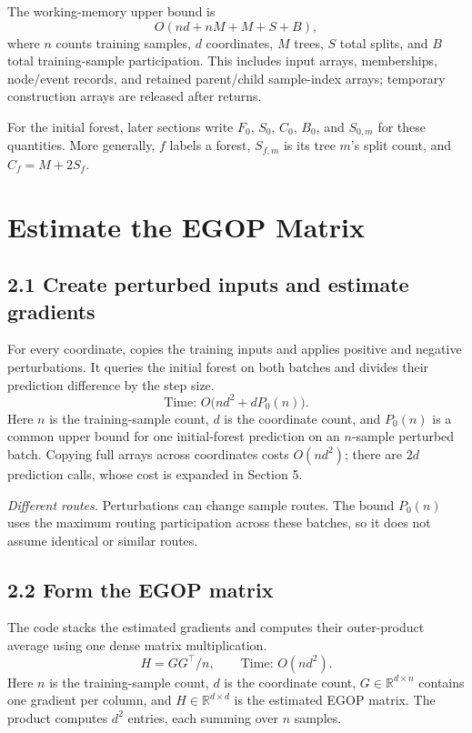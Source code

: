 \documentclass[11pt]{article}
\newcommand{\code}[1]{\texttt{\detokenize{#1}}}
\begin{document}
The working-memory upper bound is
\[
O(nd+nM+M+S+B),
\]
where $n$ counts training samples, $d$ coordinates, $M$ trees, $S$ total splits,
and $B$ total training-sample participation. This includes input arrays,
memberships, node/event records, and retained parent/child sample-index arrays;
temporary construction arrays are released after \code{train} returns.

For the initial forest, later sections write $F_0$, $S_0$, $C_0$, $B_0$, and
$S_{0,m}$ for these quantities. More generally, $f$ labels a forest,
$S_{f,m}$ is its tree $m$'s split count, and $C_f=M+2S_f$.

\section{Estimate the EGOP Matrix}

\subsection*{2.1 Create perturbed inputs and estimate gradients}
For every coordinate, \code{TrIM._get_importance} copies the training inputs
and applies positive and negative perturbations. It queries the initial forest
on both batches and divides their prediction difference by the step size.
\[
\text{Time: }O\bigl(nd^2+dP_0(n)\bigr).
\]
Here $n$ is the training-sample count, $d$ is the coordinate count, and $P_0(n)$
is a common upper bound for one initial-forest prediction on an $n$-sample
perturbed batch. Copying full arrays across coordinates costs $O(nd^2)$;
there are $2d$ prediction calls, whose cost is expanded in Section 5.

\emph{Different routes.} Perturbations can change sample routes. The bound
$P_0(n)$ uses the maximum routing participation across these batches, so it
does not assume identical or similar routes.

\subsection*{2.2 Form the EGOP matrix}
The code stacks the estimated gradients and computes their outer-product
average using one dense matrix multiplication.
\[
H=GG^\top/n,\qquad \text{Time: }O(nd^2).
\]
Here $n$ is the training-sample count, $d$ is the coordinate count,
$G\in\mathbb{R}^{d\times n}$ contains one gradient per column, and
$H\in\mathbb{R}^{d\times d}$ is the estimated EGOP matrix. The product computes
$d^2$ entries, each summing over $n$ samples.
\end{document}
